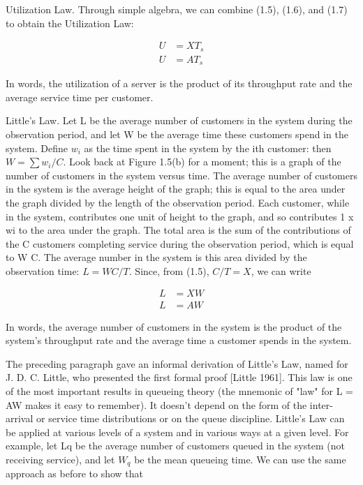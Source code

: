 Utilization Law. Through simple algebra, we can combine (1.5), (1.6), and (1.7)
to obtain the Utilization Law:

\begin{align}
U &= X T_s \tag{1.8}\\
U &= A T_s \tag{1.9}
\end{align}

In words, the utilization of a server is the product of its
throughput rate and the average service time per customer.

Little's Law. Let L be the average number of customers in the system during
the observation period, and let W be the average time these customers spend in
the system. Define \ensuremath{w_i} as the time spent in the system by the ith customer:
then \ensuremath{W = \sum w_i / C}. Look back at Figure 1.5(b) for a moment; this is a graph
of the number of customers in the system versus time. The average number of
customers in the system is the average height of the graph; this is equal to
the area under the graph divided by the length of the observation period. Each
customer, while in the system, contributes one unit of height to the graph, and
so contributes 1 x wi to the area under the graph. The total area is the sum
of the contributions of the C customers completing service during the
observation period, which is equal to W C. The average number in the system is
this area divided by the observation time: \ensuremath{L = W C / T}. Since, from (1.5),
\ensuremath{C/T = X}, we can write

\begin{align}
L &= X W \tag{1.10}\\
L &= A W \tag{1.11}
\end{align}

In words, the average number of customers in the system is the product of the
system's throughput rate and the average time a customer spends in the system.

The preceding paragraph gave an informal derivation of Little's Law, named for
J. D. C. Little, who presented the first formal proof [Little 1961]. This law
is one of the most important results in queueing theory (the mnemonic of "law"
for L = AW makes it easy to remember). It doesn't depend on the form of the
inter-arrival or service time distributions or on the queue discipline. Little's
Law can be applied at various levels of a system and in various ways at a given
level. For example, let Lq be the average number of customers queued in the
system (not receiving service), and let \ensuremath{W_q} be the mean queueing time. We can
use the same approach as before to show that

